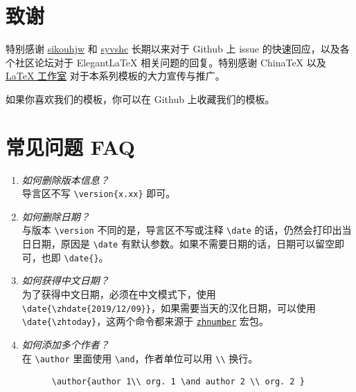 \section{致谢}

特别感谢 \href{https://github.com/sikouhjw}{sikouhjw} 和 \href{https://github.com/syvshc}{syvshc}  长期以来对于 Github 上 issue 的快速回应，以及各个社区论坛对于 ElegantLaTeX 相关问题的回复。特别感谢 ChinaTeX 以及 \href{http://www.latexstudio.net/}{LaTeX 工作室} 对于本系列模板的大力宣传与推广。

如果你喜欢我们的模板，你可以在 Github 上收藏我们的模板。

\section{常见问题 FAQ}

\begin{enumerate}[label=\arabic*).]
  \item \textit{如何删除版本信息？}\\
    导言区不写 \lstinline|\version{x.xx}| 即可。
  \item \textit{如何删除日期？}\\
    与版本 \lstinline{\version} 不同的是，导言区不写或注释 \lstinline{\date} 的话，仍然会打印出当日日期，原因是 \lstinline{\date} 有默认参数。如果不需要日期的话，日期可以留空即可，也即 \lstinline|\date{}|。
  \item \textit{如何获得中文日期？}\\
    为了获得中文日期，必须在中文模式下，使用 \lstinline|\date{\zhdate{2019/12/09}}|，如果需要当天的汉化日期，可以使用 \lstinline|\date{\zhtoday}|，这两个命令都来源于 \href{https://ctan.org/pkg/zhnumber}{\lstinline{zhnumber}} 宏包。
  \item \textit{如何添加多个作者？}\\
    在 \lstinline{\author} 里面使用 \lstinline{\and}，作者单位可以用 \lstinline{\\} 换行。
    \begin{lstlisting}
      \author{author 1\\ org. 1 \and author 2 \\ org. 2 }
    \end{lstlisting}
\end{enumerate}
